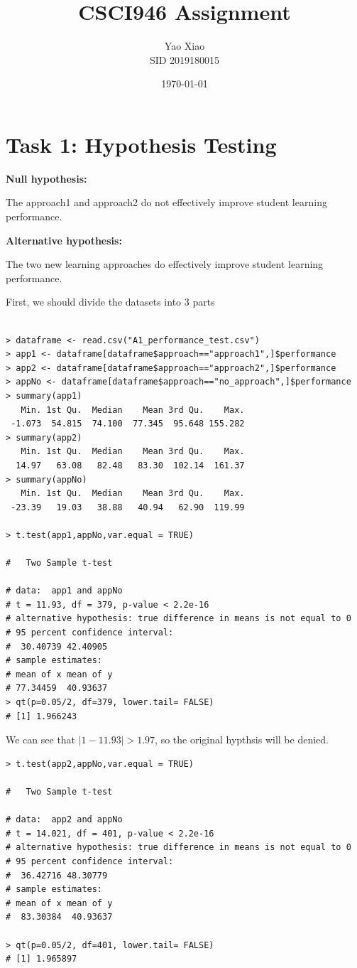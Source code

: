 \documentclass{article}
\title{CSCI946 Assignment}
\author{Yao Xiao \\ SID 2019180015}
\date{\today}
\begin{document}
\maketitle

\section{Task 1: Hypothesis Testing}
\textbf{Null hypothesis:}

The approach1 and approach2 do not effectively improve student learning performance.

\textbf{Alternative hypothesis:}

The two new learning approaches do effectively improve student learning performance.

First, we should divide the datasets into 3 parts
\begin{lstlisting}

> dataframe <- read.csv("A1_performance_test.csv")
> app1 <- dataframe[dataframe$approach=="approach1",]$performance
> app2 <- dataframe[dataframe$approach=="approach2",]$performance
> appNo <- dataframe[dataframe$approach=="no_approach",]$performance
> summary(app1)
   Min. 1st Qu.  Median    Mean 3rd Qu.    Max. 
 -1.073  54.815  74.100  77.345  95.648 155.282 
> summary(app2)
   Min. 1st Qu.  Median    Mean 3rd Qu.    Max. 
  14.97   63.08   82.48   83.30  102.14  161.37 
> summary(appNo)
   Min. 1st Qu.  Median    Mean 3rd Qu.    Max. 
 -23.39   19.03   38.88   40.94   62.90  119.99 

> t.test(app1,appNo,var.equal = TRUE)

#	Two Sample t-test

# data:  app1 and appNo
# t = 11.93, df = 379, p-value < 2.2e-16
# alternative hypothesis: true difference in means is not equal to 0
# 95 percent confidence interval:
#  30.40739 42.40905
# sample estimates:
# mean of x mean of y 
# 77.34459  40.93637
> qt(p=0.05/2, df=379, lower.tail= FALSE)
# [1] 1.966243
\end{lstlisting}

We can see that $|1-11.93| > 1.97$, so the original hypthsis will be denied.

\begin{lstlisting}
> t.test(app2,appNo,var.equal = TRUE)

#  	Two Sample t-test

# data:  app2 and appNo
# t = 14.021, df = 401, p-value < 2.2e-16
# alternative hypothesis: true difference in means is not equal to 0
# 95 percent confidence interval:
#  36.42716 48.30779
# sample estimates:
# mean of x mean of y 
#  83.30384  40.93637 

> qt(p=0.05/2, df=401, lower.tail= FALSE)
# [1] 1.965897
\end{lstlisting}
\end{document}
